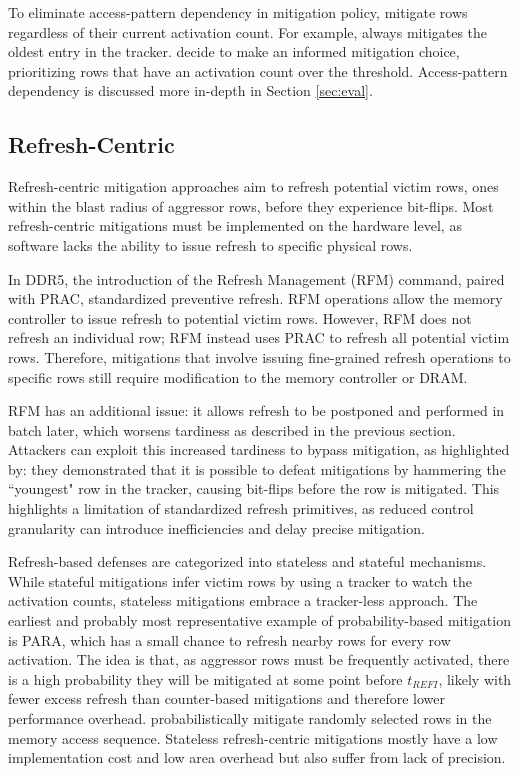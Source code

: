 \documentclass[journal,twocolumn]{IEEEtran}
\begin{document}
To eliminate access-pattern dependency in mitigation policy, \cite{Demirseren24,Jaleel24} mitigate rows regardless of their current activation count. For example, \cite{Jaleel24} always mitigates the oldest entry in the tracker.  \cite{Kim23,Bostanci24,Nazaraliyev25,Lin25,Olgun24,Woo25} decide to make an informed mitigation choice, prioritizing rows that have an activation count over the threshold. Access-pattern dependency is discussed more in-depth in Section \ref{sec:eval}.

\subsection{Refresh-Centric}\label{sec:refresh-centric}

Refresh-centric mitigation approaches aim to refresh potential victim rows, ones within the blast radius of aggressor rows, before they experience bit-flips. Most refresh-centric mitigations must be implemented on the hardware level, as software lacks the ability to issue refresh to specific physical rows.

In DDR5, the introduction of the Refresh Management (RFM) command, paired with PRAC, standardized preventive refresh\cite{JESD79-5C}. RFM operations allow the memory controller to issue refresh to potential victim rows. However, RFM does not refresh an individual row; RFM instead uses PRAC to refresh all potential victim rows. Therefore, mitigations that involve issuing fine-grained refresh operations to specific rows still require modification to the memory controller or DRAM.

RFM has an additional issue: it allows refresh to be postponed and performed in batch later\cite{Qureshi24}, which worsens tardiness as described in the previous section. Attackers can exploit this increased tardiness to bypass mitigation, as highlighted by\cite{Qureshi25}: they demonstrated that it is possible to defeat mitigations by hammering the ``youngest" row in the tracker, causing bit-flips before the row is mitigated. This highlights a limitation of standardized refresh primitives, as reduced control granularity can introduce inefficiencies and delay precise mitigation.

Refresh-based defenses are categorized into stateless and stateful mechanisms. While stateful mitigations infer victim rows by using a tracker to watch the activation counts, stateless mitigations embrace a tracker-less approach. The earliest and probably most representative example of probability-based mitigation is PARA\cite{Kim14}, which has a small chance to refresh nearby rows for every row activation. The idea is that, as aggressor rows must be frequently activated, there is a high probability they will be mitigated at some point before $t_{REFI}$, likely with fewer excess refresh than counter-based mitigations and therefore lower performance overhead. \cite{Qureshi24,Woo24}  probabilistically mitigate randomly selected rows in the memory access sequence. Stateless refresh-centric mitigations mostly have a low implementation cost and low area overhead but also suffer from lack of precision. 
\end{document}
